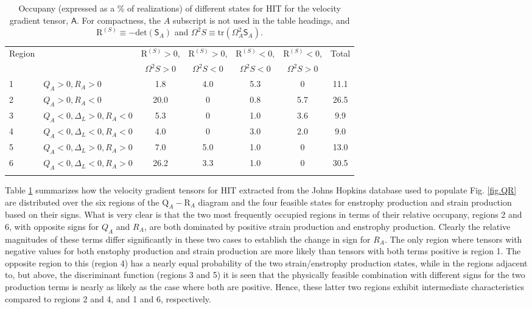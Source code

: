 \documentclass[preprint,amssymb,amsmath,aip,cha]{revtex4-1}
\begin{document}
\begin{table}
\caption{Occupany (expressed as a \% of realizations) of different states for HIT for the velocity gradient tensor, $\mathsf{A}$. For compactness, the $A$ subscript is not used in the table headings, and $\mbox{R}^{(S)} \equiv -\mbox{det}(\mathsf{S}_{A})$ and $\Omega^{2}S \equiv \mbox{tr}(\mathsf{\Omega}_{A}^{2}\mathsf{S}_{A})$.}
\centering
\begin{tabular}{llccccc}
\noalign{\smallskip}
Region & & $\mbox{R}^{(S)} > 0$, & $\mbox{R}^{(S)} > 0$, & $\mbox{R}^{(S)} < 0$, & $\mbox{R}^{(S)} < 0$, & Total \\
 & & $\Omega^{2} S > 0$ & $\Omega^{2}S < 0$ & $\Omega^{2}S < 0$ & $\Omega^{2}S > 0$ &\\
\noalign{\smallskip}%
1 & $Q_{A} > 0, R_{A} > 0$ & 1.8 & 4.0 & 5.3 & 0 & 11.1\\
2 & $Q_{A} > 0, R_{A} < 0$ & 20.0 & 0 & 0.8 & 5.7 & 26.5\\
3 & $Q_{A} < 0, \Delta_{L} > 0, R_{A} < 0$ & 5.3 & 0 & 1.0 & 3.6 & 9.9\\
4 & $Q_{A} < 0, \Delta_{L} < 0, R_{A} < 0$ & 4.0 & 0 & 3.0 & 2.0 & 9.0\\
5 & $Q_{A} < 0, \Delta_{L} > 0, R_{A} > 0$ & 7.0 & 5.0 & 1.0 & 0 & 13.0\\
6 & $Q_{A} < 0, \Delta_{L} < 0, R_{A} > 0$ & 26.2 & 3.3 & 1.0 & 0 & 30.5\\
\noalign{\smallskip}%
\label{table.Q_wws_sss}
\end{tabular}
\end{table}

Table \ref{table.Q_wws_sss} summarizes how the velocity gradient tensors for HIT extracted from the Johns Hopkins database used to populate Fig. \ref{fig.QR} are distributed over the six regions of the $\mbox{Q}_{A}-\mbox{R}_{A}$ diagram and the four feasible states for enstrophy production and strain production based on their signs. What is very clear is that the two most frequently occupied regions in terms of their relative occupany, regions 2 and 6, with opposite signs for $Q_{A}$ and $R_{A}$, are both dominated by positive strain production and enstrophy production. Clearly the relative magnitudes of these terms differ significantly in these two cases to establish the change in sign for $R_{A}$. The only region where tensors with negative values for both enstophy production and strain production are more likely than tensors with both terms positive is region 1. The opposite region to this (region 4) has a nearly equal probability of the two strain/enstrophy production states, while in the regions adjacent to, but above, the discriminant function (regions 3 and 5) it is seen that the physically feasible combination with different signs for the two production terms is nearly as likely as the case where both are positive. Hence, these latter two regions exhibit intermediate characteristics compared to regions 2 and 4, and 1 and 6, respectively.
\end{document}
